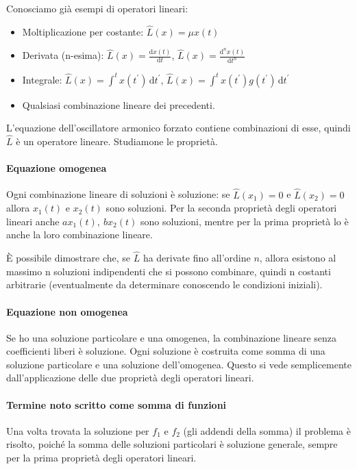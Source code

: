\begin{eg}
	Conosciamo già esempi di operatori lineari:
	\begin{itemize}
		
		\item Moltiplicazione per costante: \(\hat{L} (x)=\mu x(t)\)
		\item Derivata (n-esima): \(\hat{L} (x) = \frac{\mathrm{d}x(t)}{\mathrm{d}t} \), \(\hat{L} (x) = \frac{\mathrm{d}^n x(t)}{\mathrm{d}t^n} \)
		\item Integrale: \(\hat{L} (x) = \int_{}^{t} x (t^{\prime} ) \,\mathrm{d}t^{\prime}\), \(\hat{L} (x) = \int_{}^{t} x (t^{\prime} )g(t^{\prime} ) \,\mathrm{d}t^{\prime}  \) 
		\item Qualsiasi combinazione lineare dei precedenti.
	\end{itemize}
\end{eg}

L'equazione dell'oscillatore armonico forzato contiene combinazioni di esse, quindi \(\hat{L} \) è un operatore lineare. Studiamone le proprietà.

\paragraph{Equazione omogenea}

Ogni combinazione lineare di soluzioni è soluzione: se \(\hat{L} (x_{1} ) = 0\) e \(\hat{L} (x_{2}) = 0\) allora \(x_{1}(t) \) e \(x_{2}(t) \) sono soluzioni. Per la seconda proprietà degli operatori lineari anche \(ax_{1}(t),\ bx_{2}(t)  \) sono soluzioni, mentre per la prima proprietà lo è anche la loro combinazione lineare.

È possibile dimostrare che, se \(\hat{L} \) ha derivate fino all'ordine \(n\), allora esistono al massimo n soluzioni indipendenti che si possono combinare, quindi n costanti arbitrarie (eventualmente da determinare conoscendo le condizioni iniziali).

\paragraph{Equazione non omogenea} Se ho una soluzione particolare e una omogenea, la combinazione lineare senza coefficienti liberi è soluzione. Ogni soluzione è costruita come somma di una soluzione particolare e una soluzione dell'omogenea. Questo si vede semplicemente dall'applicazione delle due proprietà degli operatori lineari.

\paragraph{Termine noto scritto come somma di funzioni} Una volta trovata la soluzione per \(f_1\) e \(f_2\) (gli addendi della somma) il problema è risolto, poiché la somma delle soluzioni particolari è soluzione generale, sempre per la prima proprietà degli operatori lineari.

